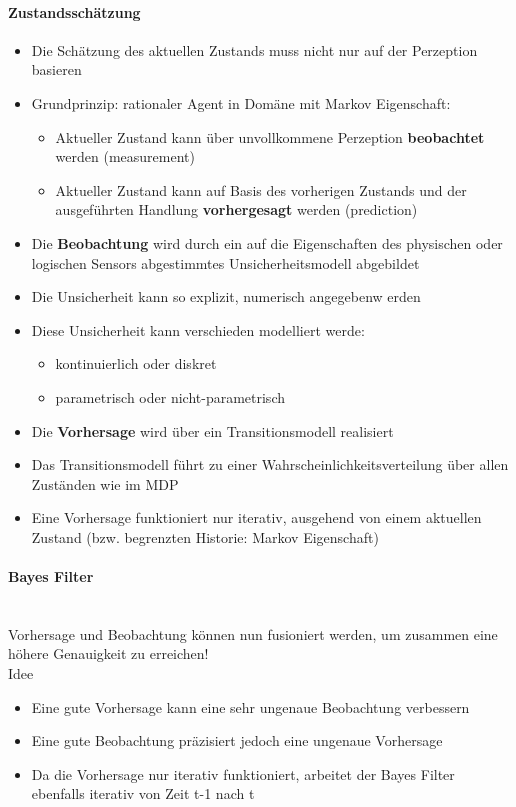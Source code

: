 \paragraph{Zustandssch\"atzung}
\begin{itemize}
	\item Die Sch\"atzung des aktuellen Zustands muss nicht nur auf der Perzeption basieren
	\item Grundprinzip: rationaler Agent in Dom\"ane mit Markov Eigenschaft:
	\begin{itemize}
		\item Aktueller Zustand kann \"uber unvollkommene Perzeption \textbf{beobachtet} werden (measurement)
		\item Aktueller Zustand kann auf Basis des vorherigen Zustands und der ausgef\"uhrten Handlung \textbf{vorhergesagt} werden (prediction)
	\end{itemize}
	\item Die \textbf{Beobachtung} wird durch ein auf die Eigenschaften des physischen oder logischen Sensors abgestimmtes Unsicherheitsmodell abgebildet
	\item Die Unsicherheit kann so explizit, numerisch angegebenw erden
	\item Diese Unsicherheit kann verschieden modelliert werde:
	\begin{itemize}
		\item kontinuierlich oder diskret
		\item parametrisch oder nicht-parametrisch
	\end{itemize}
	\item Die \textbf{Vorhersage} wird \"uber ein Transitionsmodell realisiert
	\item Das Transitionsmodell f\"uhrt zu einer Wahrscheinlichkeitsverteilung \"uber allen Zust\"anden wie im MDP
	\item Eine Vorhersage funktioniert nur iterativ, ausgehend von einem aktuellen Zustand (bzw. begrenzten Historie: Markov Eigenschaft)
\end{itemize}

\paragraph{Bayes Filter} {\ }\\
Vorhersage und Beobachtung k\"onnen nun fusioniert werden, um zusammen eine h\"ohere Genauigkeit zu erreichen!\\

Idee
\begin{itemize}
	\item Eine gute Vorhersage kann eine sehr ungenaue Beobachtung verbessern
	\item Eine gute Beobachtung pr\"azisiert jedoch eine ungenaue Vorhersage
	\item Da die Vorhersage nur iterativ funktioniert, arbeitet der Bayes Filter ebenfalls iterativ von Zeit t-1 nach t 
\end{itemize}


